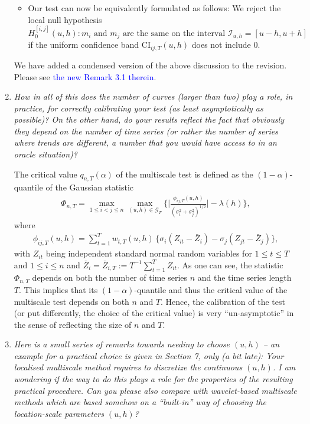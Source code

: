 \documentclass[a4paper,12pt]{article}
\begin{document}
\begin{enumerate}[label=\arabic*.,leftmargin=0.6cm]
\begin{itemize}[leftmargin=0.45cm,itemsep=0pt,topsep=0pt]
\item Our test can now be equivalently formulated as follows: We reject the local null hypothesis
\[ H_0^{[i,j]}(u,h): m_i \text{ and } m_j \text{ are the same on the interval } \mathcal{I}_{u,h} = [u-h,u+h] \]
if the uniform confidence band $\text{CI}_{ij,T}(u,h)$ does not include $0$. 

\end{itemize} 
We have added a condensed version of the above discussion to the revision. Please see \textcolor{blue}{the new Remark 3.1 therein}. 


\item \textit{How in all of this does the number of curves (larger than two) play a role, in practice, for correctly calibrating your test (as least asymptotically as possible)? On the other hand, do your results reflect the fact that obviously they depend on the number of time series (or rather the number of series where trends are different, a number that you would have access to in an oracle situation)?}

The critical value $q_{n,T}(\alpha)$ of the multiscale test is defined as the $(1-\alpha)$-quantile of the Gaussian statistic 
\begin{align}\label{eq:Phi}
\Phi_{n,T} = \max_{1 \le i < j \le n}\max_{(u, h) \in \mathcal{G}_T} \Big\{ \bigg|\frac{\phi_{ij, T}(u, h)}{(\sigma_i^2 + \sigma_j^2)^{1/2}}\bigg| - \lambda(h) \Big\},
\end{align}
where
\begin{align*}
\phi_{ij, T}(u, h) = \sum\limits_{t=1}^T w_{t,T}(u, h) \, \big\{ \sigma_i (Z_{it} - \bar{Z}_i) - \sigma_j (Z_{jt} - \bar{Z}_j) \big\},
\end{align*}
with $Z_{it}$ being independent standard normal random variables for $1 \le t \le T$ and $1 \le i \le n$ and $\bar{Z}_i = \bar{Z}_{i,T} := T^{-1} \sum_{t=1}^T Z_{it}$. As one can see, the statistic $\Phi_{n,T}$ depends on both the number of time series $n$ and the time series length $T$. This implies that its $(1-\alpha)$-quantile and thus the critical value of the multiscale test depends on both $n$ and $T$. Hence, the calibration of the test (or put differently, the choice of the critical value) is very ``un-asymptotic'' in the sense of reflecting the size of $n$ and $T$. 


\item \textit{Here is a small series of remarks towards needing to choose $(u, h)$ -- an example for a practical choice is given in Section 7, only (a bit late): Your localised multiscale method requires to discretize the continuous $(u, h)$. I am wondering if the way to do this plays a role for the properties of the resulting practical procedure. Can you please also compare with wavelet-based multiscale methods which are based somehow on a ``built-in'' way of choosing the location-scale parameters $(u, h)$?}  


\end{enumerate}
\end{document}
